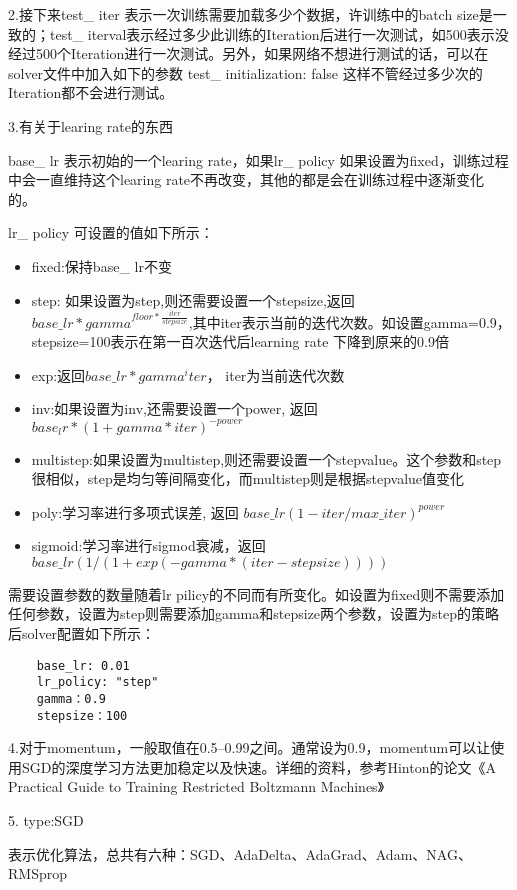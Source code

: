     2.接下来test\_ iter 表示一次训练需要加载多少个数据，许训练中的batch size是一致的；test\_ iterval表示经过多少此训练的Iteration后进行一次测试，如500表示没经过500个Iteration进行一次测试。另外，如果网络不想进行测试的话，可以在solver文件中加入如下的参数 test\_ initialization: false 这样不管经过多少次的Iteration都不会进行测试。
    
    3.有关于learing rate的东西
    
    base\_ lr 表示初始的一个learing rate，如果lr\_ policy 如果设置为fixed，训练过程中会一直维持这个learing rate不再改变，其他的都是会在训练过程中逐渐变化的。
    
    lr\_ policy 可设置的值如下所示：
    \begin{itemize}
    	\item fixed:保持base\_ lr不变
    	\item step: 如果设置为step,则还需要设置一个stepsize,返回 $base\_ lr*gamma^{floor*         \frac{iter}{stepsize}}$,其中iter表示当前的迭代次数。如设置gamma=0.9，stepsize=100表示在第一百次迭代后learning rate 下降到原来的0.9倍
    	\item exp:返回$base\_ lr * gamma ^ iter$， iter为当前迭代次数
    	\item inv:如果设置为inv,还需要设置一个power, 返回$base_lr * (1 + gamma * iter) ^ {- power}$
    	\item multistep:如果设置为multistep,则还需要设置一个stepvalue。这个参数和step很相似，step是均匀等间隔变化，而multistep则是根据stepvalue值变化
    	\item poly:学习率进行多项式误差, 返回 $base\_lr (1 - iter/max\_ iter) ^ {power}$
    	\item sigmoid:学习率进行sigmod衰减，返回 $base\_lr ( 1/(1 + exp(-gamma * (iter - stepsize))))$
    
    \end{itemize}
    需要设置参数的数量随着lr pilicy的不同而有所变化。如设置为fixed则不需要添加任何参数，设置为step则需要添加gamma和stepsize两个参数，设置为step的策略后solver配置如下所示：
    \begin{lstlisting}
	base_lr: 0.01
	lr_policy: "step"
	gamma：0.9
	stepsize：100
	\end{lstlisting}
	
	4.对于momentum，一般取值在0.5--0.99之间。通常设为0.9，momentum可以让使用SGD的深度学习方法更加稳定以及快速。详细的资料，参考Hinton的论文《A Practical Guide to Training Restricted Boltzmann Machines》
    
    5. type:SGD
    
    表示优化算法，总共有六种：SGD、AdaDelta、AdaGrad、Adam、NAG、RMSprop
    
